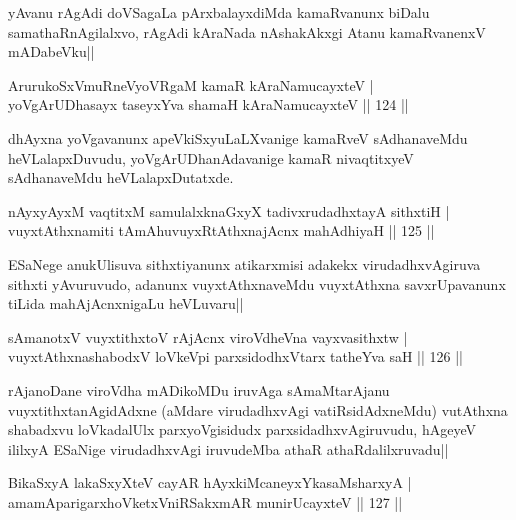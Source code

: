 \begin{artha}
yAvanu rAgAdi doVSagaLa pArxbalayxdiMda kamaRvanunx biDalu samathaRnAgilalxvo, rAgAdi kAraNada nAshakAkxgi Atanu kamaRvanenxV mADabeVku||
\end{artha}


\begin{shl}
ArurukoSxVmuRneVyoVRgaM kamaR kAraNamucayxteV |\\
yoVgArUDhasayx taseyxYva shamaH kAraNamucayxteV \hfill || 124 ||
\end{shl}

\begin{artha}%
dhAyxna yoVgavanunx apeVkiSxyuLaLXvanige kamaRveV sAdhanaveMdu heVLalapxDuvudu, yoVgArUDhanAdavanige kamaR nivaqtitxyeV sAdhanaveMdu heVLalapxDutatxde.
\end{artha}

\begin{shl}
nAyxyAyxM vaqtitxM samulalxknaGxyX tadivxrudadhxtayA sithxtiH |\\
vuyxtAthxnamiti tAmAhuvuyxRtAthxnajAcnx mahAdhiyaH \hfill || 125 ||
\end{shl}

\begin{artha}
ESaNege anukUlisuva sithxtiyanunx atikarxmisi adakekx virudadhxvAgiruva sithxti yAvuruvudo, adanunx vuyxtAthxnaveMdu vuyxtAthxna savxrUpavanunx tiLida mahAjAcnxnigaLu heVLuvaru||
\end{artha}


\begin{shl}
sAmanotxV  vuyxtithxtoV rAjAcnx viroVdheVna vayxvasithxtw |\\
vuyxtAthxnashabodxV loVkeV\s pi parxsidodhxV\s tarx tatheYva saH \hfill || 126 ||
\end{shl}

\begin{artha}
rAjanoDane viroVdha mADikoMDu iruvAga sAmaMtarAjanu vuyxtithxtanAgidAdxne (aMdare virudadhxvAgi vatiRsidAdxneMdu) vutAthxna shabadxvu loVkadalUlx parxyoVgisidudx parxsidadhxvAgiruvudu, hAgeyeV ililxyA ESaNige virudadhxvAgi iruvudeMba athaR athaRdalilxruvadu||
\end{artha}


\begin{shl}
BikaSxyA lakaSxyXteV cayAR hAyxkiMcaneyxYkasaMsharxyA |\\
amamAparigarxhoVketxVniRSakxmAR munirUcayxteV \hfill || 127 ||
\end{shl}


